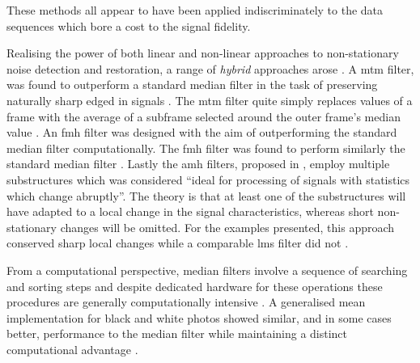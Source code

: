 These methods all appear to have been applied indiscriminately to the data sequences which bore a cost to the signal fidelity.


Realising the power of both linear and non-linear approaches to non-stationary noise detection and restoration, a range of \emph{hybrid} approaches arose \cite{Nieminen1987a}\cite{Lee1985}\cite{Heinonen1987}. A \DIFdelbegin {}\DIFdelend \DIFaddbegin \gls{mtm} \DIFaddend filter, was found to outperform a standard median filter in the task of preserving naturally sharp edged in signals \cite{Lee1985}. The \DIFdelbegin {}\DIFdelend \DIFaddbegin \gls{mtm} \DIFaddend filter quite simply replaces values of a frame with the average of a subframe selected around the outer frame's median value \cite{Lee1985}. An \DIFdelbegin {}\DIFdelend \DIFaddbegin \gls{fmh} \DIFaddend filter was designed with the aim of outperforming the standard median filter computationally. The \DIFdelbegin {}\DIFdelend \DIFaddbegin \gls{fmh} \DIFaddend filter was found to perform similarly the \DIFdelbegin {}\DIFdelend standard median filter \cite{Heinonen1987}. Lastly the \DIFdelbegin {}\DIFdelend \DIFaddbegin \gls{amh} \DIFaddend filters, proposed in \cite{Nieminen1987a}, employ multiple substructures which was considered ``ideal for processing of signals with statistics which change abruptly''. The theory is that at least one of the substructures will have adapted to a local change in the signal characteristics, whereas short non-stationary changes will be omitted. For the examples presented, this approach conserved sharp local changes while a comparable \DIFdelbegin {}\DIFdelend \DIFaddbegin \gls{lms} \DIFaddend filter did not \cite{Nieminen1987a}.

From a computational perspective, median filters involve a sequence of searching and sorting steps and despite dedicated hardware for these operations these procedures are generally computationally intensive \cite{Kundu1984}. A generalised mean implementation for black and white photos showed similar, and in some cases better, performance to the median filter while maintaining a distinct computational advantage \cite{Kundu1984}.

